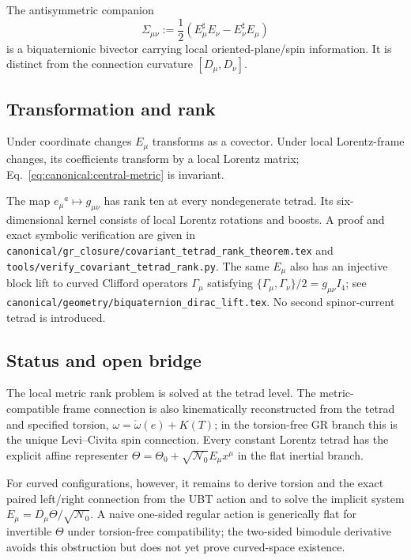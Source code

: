 The antisymmetric companion
\begin{equation}
 \Sigma_{\mu\nu}:=\frac12(E_\mu^\sharp E_\nu-E_\nu^\sharp E_\mu)
\end{equation}
is a biquaternionic bivector carrying local oriented-plane/spin information.
It is distinct from the connection curvature $[D_\mu,D_\nu]$.

\subsection{Transformation and rank}
Under coordinate changes $E_\mu$ transforms as a covector.  Under local
Lorentz-frame changes, its coefficients transform by a local Lorentz matrix;
Eq.~\eqref{eq:canonical:central-metric} is invariant.

The map $e_\mu{}^a\mapsto g_{\mu\nu}$ has rank ten at every nondegenerate
tetrad.  Its six-dimensional kernel consists of local Lorentz rotations and
boosts.  A proof and exact symbolic verification are given in
\texttt{canonical/gr\_closure/covariant\_tetrad\_rank\_theorem.tex} and
\texttt{tools/verify\_covariant\_tetrad\_rank.py}.
The same $E_\mu$ also has an injective block lift to curved Clifford
operators $\Gamma_\mu$ satisfying
$\{\Gamma_\mu,\Gamma_\nu\}/2=g_{\mu\nu}I_4$; see
\texttt{canonical/geometry/biquaternion\_dirac\_lift.tex}.  No second
spinor-current tetrad is introduced.

\subsection{Status and open bridge}
The local metric rank problem is solved at the tetrad level.  The
metric-compatible frame connection is also kinematically reconstructed from
the tetrad and specified torsion,
$\omega=\mathring\omega(e)+K(T)$; in the torsion-free GR branch this is the
unique Levi--Civita spin connection.  Every constant Lorentz tetrad has the
explicit affine representer
$\Theta=\Theta_0+\sqrt{\mathcal N_0}E_\mu x^\mu$ in the flat inertial branch.

For curved configurations, however, it remains to derive torsion and the exact
paired left/right connection from the UBT action and to solve the implicit
system $E_\mu=D_\mu\Theta/\sqrt{\mathcal N_0}$.  A naive one-sided regular
action is generically flat for invertible $\Theta$ under torsion-free
compatibility; the two-sided bimodule derivative avoids this obstruction but
does not yet prove curved-space existence.
